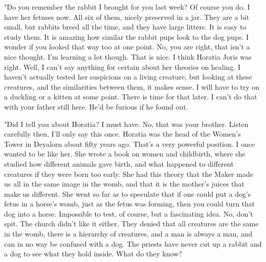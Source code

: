 \documentclass{article}
\begin{document}
"Do you remember the rabbit I brought for you last week? Of course you do. I have her fetuses now. All six of them, nicely preserved in a jar. They are a bit small, but rabbits breed all the time, and they have large litters. It is easy to study them. It is amazing how similar the rabbit pups look to the dog pups. I wonder if you looked that way too at one point. No, you are right, that isn't a nice thought. I'm learning a lot though. That is nice. I think Horatia Joris was right. Well, I can't say anything for certain about her theories on healing. I haven't actually tested her suspicions on a living creature, but looking at these creatures, and the similarities between them, it makes sense. I will have to try on a duckling or a kitten at some point. There is time for that later. I can't do that with your father still here. He'd be furious if he found out.

"Did I tell you about Horatia? I must have. No, that was your brother. Listen carefully then, I'll only say this once. Horatia was the head of the Women's Tower in Deyalorn about fifty years ago. That's a very powerful position. I once wanted to be like her. She wrote a book on women and childbirth, where she studied how different animals gave birth, and what happened to different creatures if they were born too early. She had this theory that the Maker made us all in the same image in the womb, and that it is the mother's juices that make us different. She went so far as to speculate that if one could put a dog's fetus in a horse's womb, just as the fetus was forming, then you could turn that dog into a horse. Impossible to test, of course, but a fascinating idea. No, don't spit. The church didn't like it either. They denied that all creatures are the same in the womb, there is a hierarchy of creatures, and a man is always a man, and can in no way be confused with a dog. The priests have never cut up a rabbit and a dog to see what they hold inside. What do they know?
\end{document}
